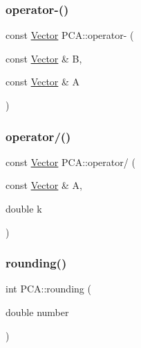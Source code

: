 \hypertarget{namespace_p_c_a_a430437e74079b33bcf7a99ef38c01134}{}\label{namespace_p_c_a_a430437e74079b33bcf7a99ef38c01134} 
\subsubsection{\texorpdfstring{operator-\/()}{operator-()}}
{\footnotesize\ttfamily const \hyperlink{class_p_c_a_1_1_vector}{Vector} P\+C\+A\+::operator-\/ (\begin{DoxyParamCaption}\item[{const \hyperlink{class_p_c_a_1_1_vector}{Vector} \&}]{B,  }\item[{const \hyperlink{class_p_c_a_1_1_vector}{Vector} \&}]{A }\end{DoxyParamCaption})\hspace{0.3cm}{\ttfamily [inline]}}

\hypertarget{namespace_p_c_a_a5144cc8f2a3d8ab924e8c4c1c32a2aed}{}\label{namespace_p_c_a_a5144cc8f2a3d8ab924e8c4c1c32a2aed} 
\subsubsection{\texorpdfstring{operator/()}{operator/()}}
{\footnotesize\ttfamily const \hyperlink{class_p_c_a_1_1_vector}{Vector} P\+C\+A\+::operator/ (\begin{DoxyParamCaption}\item[{const \hyperlink{class_p_c_a_1_1_vector}{Vector} \&}]{A,  }\item[{double}]{k }\end{DoxyParamCaption})\hspace{0.3cm}{\ttfamily [inline]}}

\hypertarget{namespace_p_c_a_acd05fa0d440ac1781a76499f3cdb3f38}{}\label{namespace_p_c_a_acd05fa0d440ac1781a76499f3cdb3f38} 
\subsubsection{\texorpdfstring{rounding()}{rounding()}}
{\footnotesize\ttfamily int P\+C\+A\+::rounding (\begin{DoxyParamCaption}\item[{double}]{number }\end{DoxyParamCaption})}



